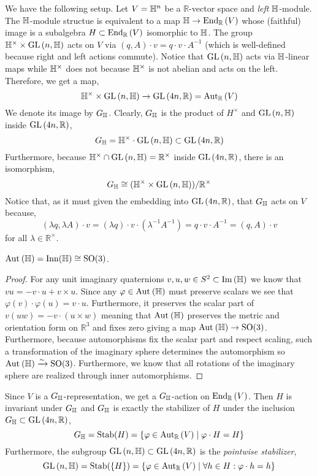 \documentclass[12pt]{extarticle}
\newcommand{\R}{\mathbb{R}}
\begin{document}
\begin{rmk}
We have the following setup. Let $V = \mathbb{H}^n$ be a $\R$-vector space and \textit{left} $\mathbb{H}$-module. The $\mathbb{H}$-module structue is equivalent to a map $\H \to \End{\R}{V}$ whose (faithful) image is a subalgebra $H \subset \End{\R}{V}$ isomorphic to $\mathbb{H}$. The group $\mathbb{H}^\times \times \mathrm{GL}\left(n, \mathbb{H} \right)$ acts on $V$ via $(q, A) \cdot v = q \cdot v \cdot A^{-1}$ (which is well-defined because right and left actions commute). Notice that $\mathrm{GL}\left(n, \mathbb{H} \right)$ acts via $\mathbb{H}$-linear maps while $\mathbb{H}^\times$ does not because $\mathbb{H}^\times$ is not abelian and acts on the left. Therefore, we get a map,
\[ \H^\times \times \GL{n, \H} \to \GL{4n, \R} = \Aut{\R}{V} \]  We denote its image by $G_{\mathbb{H}}$. Clearly, $G_{\mathbb{H}}$ is the product of $H^\times$ and $\mathrm{GL}\left(n, \mathbb{H} \right)$ inside $\GL{4n, \R}$,
\[ G_{\H} = \H^\times \cdot \GL{n, \H} \subset \GL{4n, \R} \]
Furthermore, because $\H^\times \cap \GL{n, \H} = \R^\times$ inside $\GL{4n, \R}$, there is an isomorphism,
\[ G_{\H} \cong (\H^\times \times \GL{n, \H})/\R^\times \]
Notice that, as it must given the embedding into $\GL{4n, \R}$, that $G_{\mathbb{H}}$ acts on $V$ because,
\[ (\lambda q, \lambda A) \cdot v = (\lambda q) \cdot v \cdot (\lambda^{-1} A^{-1}) = q \cdot v \cdot A^{-1} =  (q, A) \cdot v  \]
for all $\lambda \in \R^\times$.
\end{rmk}

\begin{lemma}
$\mathrm{Aut}_{}\left(\mathbb{H}\right) = \mathrm{Inn}(\mathbb{H}) \cong \mathrm{SO}(3)$.
\end{lemma}

\begin{proof}
For any unit imaginary quaternions $v, u, w \in S^2 \subset \mathrm{Im}\left( \mathbb{H} \right)$ we know that $vu = - v \cdot u + v \times u$. Since any $\varphi \in \mathrm{Aut}_{}\left(\mathbb{H}\right)$ must preserve scalars we see that $\varphi(v) \cdot \varphi(u) = v \cdot u$. Furthermore, it preserves the scalar part of $v(uw) = - v \cdot (u \times w)$ meaning that $\mathrm{Aut}_{}\left(\mathbb{H}\right)$ preserves the metric and orientation form on $\R^3$ and fixes zero giving a map $\mathrm{Aut}_{}\left(\mathbb{H}\right) \to \mathrm{SO}(3)$. Furthermore, because automorphisms fix the scalar part and respect scaling, such a transformation of the imaginary sphere determines the automorphism so $\mathrm{Aut}_{}\left(\mathbb{H}\right) \xrightarrow{\sim} \mathrm{SO}(3)$. Furthermore, we know that all rotations of the imaginary sphere are realized through inner automorphisms.
\end{proof}


\begin{lemma}
Since $V$ is a $G_{\mathbb{H}}$-representation, we get a $G_{\mathbb{H}}$-action on $\End{\R}{V}$. Then $H$ is invariant under $G_{\mathbb{H}}$ and $G_{\mathbb{H}}$ is exactly the stabilizer of $H$ under the inclusion $G_{\H} \subset \GL{4n, \R}$,
\[ G_{\H} = \mathrm{Stab}(H) = \{ \varphi \in \Aut{\R}{V} \mid \varphi \cdot H = H \} \]
Furthermore, the subgroup $\GL{n, \H} \subset \GL{4n, \R}$ is the \textit{pointwise stabilizer},
\[ \GL{n, \H} = \mathrm{Stab}(\{ H \}) = \{ \varphi \in \Aut{\R}{V} \mid \forall h \in H : \varphi \cdot h = h \} \]
\end{lemma}
\end{document}
